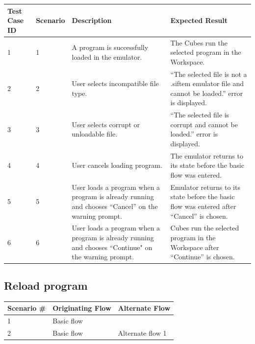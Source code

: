 \documentclass[12pt]{article}
\begin{document}
\begin{table}[h!]
  \begin{tabular}{p{.5in} | p{.75in} | p{2.15in} | p{2.15in}}
    \textbf{Test Case ID} &
    \textbf{Scenario} &
    \textbf{Description} &
    \textbf{Expected Result} \\ \hline

    1 &
    1 &
    A program is successfully loaded in the emulator. &
    The Cubes run the selected program in the Workspace. \\ \hline

    2 &
    2 &
    User selects incompatible file type. &
    ``The selected file is not a .siftem emulator file and cannot be loaded.'' error is displayed. \\ \hline

    3 &
    3 &
    User selects corrupt or unloadable file. &
    ``The selected file is corrupt and cannot be loaded.'' error is displayed. \\ \hline

    4 &
    4 &
    User cancels loading program. &
    The emulator returns to its state before the basic flow was entered. \\ \hline

    5 &
    5 &
    User loads a program when a program is already running and chooses ``Cancel'' on the warning prompt. &
    Emulator returns to its state before the basic flow was entered after ``Cancel'' is chosen. \\ \hline

    6 &
    6 &
    User loads a program when a program is already running and chooses ``Continue" on the warning prompt. &
    Cubes run the selected program in the Workspace after ``Continue'' is chosen. \\ \hline
  \end{tabular}
\end{table}
\clearpage

\subsection{Reload program}

\begin{table}[h!]
  \begin{tabular}{l | l | l}
    \textbf{Scenario \#} &
    \textbf{Originating Flow} &
    \textbf{Alternate Flow} \\ \hline

    1 &
    Basic flow &
    \\ \hline

    2 &
    Basic flow &
    Alternate flow 1 \\ \hline

  \end{tabular}
\end{table}
\end{document}
